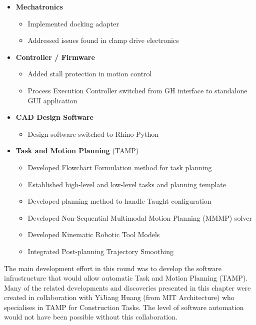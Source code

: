 \begin{itemize}
	\item \textbf{Mechatronics}
    \begin{itemize}[nosep]
	   \item Implemented docking adapter
	   \item Addressed issues found in clamp drive electronics
    \end{itemize}

	\item \textbf{Controller / Firmware}
    \begin{itemize}[nosep]
    	\item Added stall protection in motion control
    	\item Process Execution Controller switched from GH interface to standalone GUI application
    \end{itemize}

	\item \textbf{CAD Design Software}
    \begin{itemize}[nosep]
    	\item Design software switched to Rhino Python
    \end{itemize}

    \item \textbf{Task and Motion Planning }(TAMP)
    \begin{itemize}[nosep]
    	\item Developed Flowchart Formulation method for task planning
    	\item Established high-level and low-level tasks and planning template
    	\item Developed planning method to handle Taught configuration
    	\item Developed Non-Sequential Multimodal Motion Planning (MMMP) solver
    	\item Developed Kinematic Robotic Tool Models
    	\item Integrated Post-planning Trajectory Smoothing
    \end{itemize}

\end{itemize}

The main development effort in this round was to develop the software infrastructure that would allow automatic Task and Motion Planning (TAMP). Many of the related developments and discoveries presented in this chapter were created in collaboration with YiJiang Huang (from MIT Architecture) who specialises in TAMP for Construction Tasks. The level of software automation would not have been possible without this collaboration.


